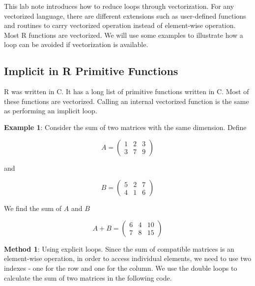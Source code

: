 \documentclass[
]{book}
\begin{document}
This lab note introduces how to reduce loops through vectorization. For any vectorized language, there are different extensions such as user-defined functions and routines to carry vectorized operation instead of element-wise operation. Most R functions are vectorized. We will use some examples to illustrate how a loop can be avoided if vectorization is available.

\hfill\break

\hypertarget{implicit-in-r-primitive-functions}{%
\subsection{Implicit in R Primitive Functions}\label{implicit-in-r-primitive-functions}}

R was written in C. It has a long list of primitive functions written in C. Most of these functions are vectorized. Calling an internal vectorized function is the same as performing an implicit loop.

\textbf{Example 1}: Consider the sum of two matrices with the same dimension. Define

\[
A = \begin{pmatrix}
1 & 2 & 3\\
3 & 7 & 9
\end{pmatrix}
\]

and

\[
B = \begin{pmatrix}
5 & 2 & 7\\
4 & 1 & 6
\end{pmatrix}
\]

We find the sum of \(A\) and \(B\)

\[
A + B = \begin{pmatrix}
6 & 4 & 10\\
7 & 8 & 15
\end{pmatrix}
\]

\textbf{Method 1}: Using explicit loops. Since the sum of compatible matrices is an element-wise operation, in order to access individual elements, we need to use two indexes - one for the row and one for the column. We use the double loops to calculate the sum of two matrices in the following code.
\end{document}
